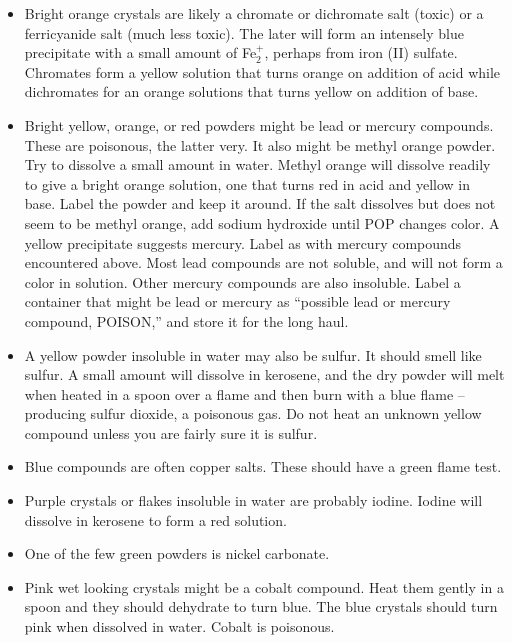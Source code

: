 \begin{itemize}

\item{Bright orange crystals are likely a chromate 
or dichromate salt (toxic) or a ferricyanide salt (much less toxic). 
The later will form an intensely blue precipitate 
with a small amount of Fe$_{2}^{+}$, 
perhaps from iron (II) sulfate. 
Chromates form a yellow solution that turns orange 
on addition of acid while dichromates for an orange solutions 
that turns yellow on addition of base.}

\item{Bright yellow, 
orange, 
or red powders might be lead or mercury compounds. 
These are poisonous, 
the latter very. 
It also might be methyl orange powder. 
Try to dissolve a small amount in water. 
Methyl orange will dissolve readily to give a bright orange solution, 
one that turns red in acid and yellow in base. 
Label the powder and keep it around. 
If the salt dissolves but does not seem to be methyl orange, 
add sodium hydroxide until POP changes color. 
A yellow precipitate suggests mercury. 
Label as with mercury compounds encountered above. 
Most lead compounds are not soluble, 
and will not form a color in solution. 
Other mercury compounds are also insoluble. 
Label a container that might be lead or mercury as 
``possible lead or mercury compound, 
POISON,'' and store it for the long haul.}

\item{A yellow powder insoluble in water may also be sulfur. 
It should smell like sulfur. 
A small amount will dissolve in kerosene, 
and the dry powder will melt when heated in a spoon 
over a flame and then burn with a blue flame -- 
producing sulfur dioxide, 
a poisonous gas. 
Do not heat an unknown yellow compound 
unless you are fairly sure it is sulfur.}

\item{Blue compounds are often copper salts. 
These should have a green flame test.}

\item{Purple crystals or flakes insoluble in water are probably iodine. 
Iodine will dissolve in kerosene to form a red solution.}

\item{One of the few green powders is nickel carbonate.}

\item{Pink wet looking crystals might be a cobalt compound. 
Heat them gently in a spoon and they should dehydrate to turn blue. 
The blue crystals should turn pink when dissolved in water. 
Cobalt is poisonous.}


\end{itemize}
